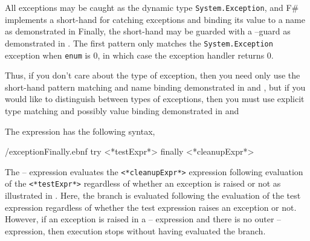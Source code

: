 All exceptions may be caught as the dynamic type \lstinline{System.Exception}, and F\# implements a short-hand for catching exceptions and binding its value to a name as demonstrated in 
%
%
Finally, the short-hand may be guarded with a --guard as demonstrated in .
%
%
The first pattern only matches the \lstinline{System.Exception} exception when \lstinline{enum} is 0, in which case the exception handler returns 0.

Thus, if you don't care about the type of exception, then you need only use the short-hand pattern matching and name binding demonstrated in  and , but if you would like to distinguish between types of exceptions, then you must use explicit type matching and possibly value binding demonstrated in  and 

The  expression has the following syntax,
%
\begin{verbatimwrite}{\ebnf/exceptionFinally.ebnf}
try
   <*testExpr*>
finally
   <*cleanupExpr*>
\end{verbatimwrite}
%
The -- expression evaluates the \lstinline[language=syntax]{<*cleanupExpr*>} expression following evaluation of the \lstinline[language=syntax]{<*testExpr*>} regardless of whether an exception is raised or not as illustrated in .
%
%
Here, the  branch is evaluated following the evaluation of the test expression regardless of whether the test expression raises an exception or not. However, if an exception is raised in a -- expression and there is no outer -- expression, then execution stops without having evaluated the  branch.


